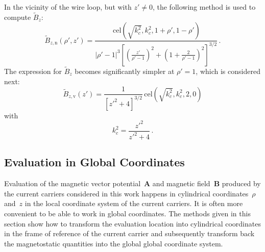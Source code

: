 In the vicinity of the wire loop, but with $z' \neq 0$,
the following method is used to compute $\tilde{B}_z$:
\begin{equation}
  \tilde{B}_{z,\mathrm{n}} (\rho', z')
  = \frac{\,\mathrm{cel}\left( \sqrt{k_c^2}, k_c^2, 1 + \rho', 1 - \rho' \right) }
         {\left|\rho' - 1 \right|^3 \left[ \left( \frac{z'}{\rho'-1} \right)^2 + \left(1 + \frac{2}{\rho'-1} \right)^2 \right]^{3/2} } \, . \label{eqn:cwl_B_z_n}
\end{equation}
The expression for $\tilde{B}_z$ becomes significantly simpler at $\rho'=1$,
which is considered next:
\begin{equation}
  \tilde{B}_{z,\mathrm{v}} (z')
  = \frac{1}{\left[ {z'}^2 + 4 \right]^{3/2}} \,\mathrm{cel}\left(\sqrt{k_c^2}, k_c^2, 2, 0 \right) \label{eqn:cwl_B_z_v}
\end{equation}
with
\begin{equation}
  k_c^2 = \frac{{z'}^2}{{z'}^2 + 4} \, .
\end{equation}


\FloatBarrier
\subsection{Evaluation in Global Coordinates}
Evaluation of the magnetic vector potential~$\mathbf{A}$ and magnetic field~$\mathbf{B}$
produced by the current carriers considered in this work
happens in cylindrical coordinates~$\rho$ and~$z$
in the local coordinate system of the current carriers.
It is often more convenient to be able to work in global coordinates.
The methods given in this section show how to transform the evaluation location
into cylindrical coordinates in the frame of reference of the current carrier
and subsequently transform back the magnetostatic quantities into the global global coordinate system.

